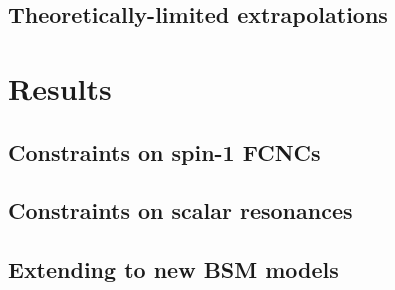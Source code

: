 \subsection{Theoretically-limited extrapolations}

\section{Results}

\subsection{Constraints on spin-1 FCNCs}

\subsection{Constraints on scalar resonances}

\subsection{Extending to new BSM models}
